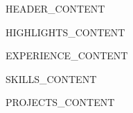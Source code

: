 \documentclass[11pt,a4paper]{article}
\begin{document}
{{HEADER_CONTENT}}

\vspace{0.5em}

\noindent%
{{HIGHLIGHTS_CONTENT}}

\vspace{1em}

{{EXPERIENCE_CONTENT}}

{{SKILLS_CONTENT}}

{{PROJECTS_CONTENT}}
\end{document}
